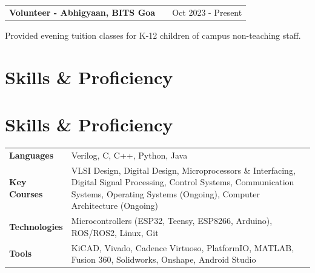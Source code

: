 \documentclass[a4paper,12pt]{article}
\makeatletter
\newenvironment{jobshort}[2]
    {\begin{tabularx}{\linewidth}{@{}l X r@{}} \textbf{#1} & \hfill &  #2 \\[3.75pt] \end{tabularx}}
    {}
\makeatother
\begin{document}
\begin{jobshort}{Volunteer - Abhigyaan, BITS Goa}{Oct 2023 - Present}
Provided evening tuition classes for K-12 children of campus non-teaching staff.
\end{jobshort}
\section{Skills \& Proficiency}\section{Skills \& Proficiency}
\begin{tabularx}{\linewidth}{@{}l X@{}}
	\textbf{Languages} & Verilog, C, C++, Python, Java \\
	\textbf{Key Courses} & VLSI Design, Digital Design, Microprocessors \& Interfacing, Digital Signal Processing, Control Systems, Communication Systems, Operating Systems (Ongoing), Computer Architecture (Ongoing)\\
	\textbf{Technologies} & Microcontrollers (ESP32, Teensy, ESP8266, Arduino), ROS/ROS2, Linux, Git \\
	\textbf{Tools} & KiCAD, Vivado, Cadence Virtuoso, PlatformIO, MATLAB, Fusion 360, Solidworks, Onshape, Android Studio \\
\end{tabularx}
\vfill
{}
\end{document}
